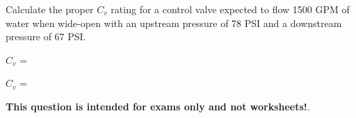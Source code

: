 

Calculate the proper $C_v$ rating for a control valve expected to flow 1500 GPM of water when wide-open with an upstream pressure of 78 PSI and a downstream pressure of 67 PSI.

\vskip 10pt

$C_v$ = \underbar{\hskip 50pt}







$C_v$ = 







{\bf This question is intended for exams only and not worksheets!}.



